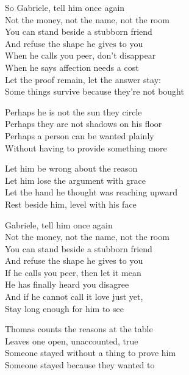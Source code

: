 \begin{lyrics}
So Gabriele, tell him once again\\
Not the money, not the name, not the room\\
You can stand beside a stubborn friend\\
And refuse the shape he gives to you\\
When he calls you peer, don’t disappear\\
When he says affection needs a cost\\
Let the proof remain, let the answer stay:\\
Some things survive because they’re not bought

Perhaps he is not the sun they circle\\
Perhaps they are not shadows on his floor\\
Perhaps a person can be wanted plainly\\
Without having to provide something more

Let him be wrong about the reason\\
Let him lose the argument with grace\\
Let the hand he thought was reaching upward\\
Rest beside him, level with his face

Gabriele, tell him once again\\
Not the money, not the name, not the room\\
You can stand beside a stubborn friend\\
And refuse the shape he gives to you\\
If he calls you peer, then let it mean\\
He has finally heard you disagree\\
And if he cannot call it love just yet,\\
Stay long enough for him to see

Thomas counts the reasons at the table\\
Leaves one open, unaccounted, true\\
Someone stayed without a thing to prove him\\
Someone stayed because they wanted to
\end{lyrics}


